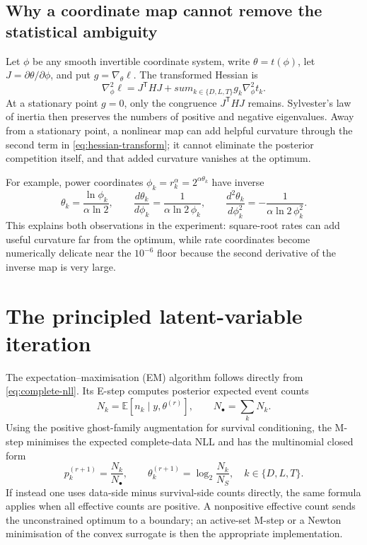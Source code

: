 \documentclass[11pt]{article}
\newcommand{\E}{\mathbb{E}}
\begin{document}
\subsection{Why a coordinate map cannot remove the statistical ambiguity}

Let $\phi$ be any smooth invertible coordinate system, write $\theta=t(\phi)$, let
$J=\partial\theta/\partial\phi$, and put $g=\nabla_\theta\ell$.  The transformed Hessian is
\begin{equation}
  \nabla_\phi^2\ell
  =J^\mathsf T HJ+sum_{k\in\{D,L,T\}}g_k\nabla_\phi^2t_k.
  \label{eq:hessian-transform}
\end{equation}
At a stationary point $g=0$, only the congruence $J^\mathsf THJ$ remains.  Sylvester's law of
inertia then preserves the numbers of positive and negative eigenvalues.  Away from a stationary
point, a nonlinear map can add helpful curvature through the second term in
\eqref{eq:hessian-transform}; it cannot eliminate the posterior competition itself, and that added
curvature vanishes at the optimum.

For example, power coordinates $\phi_k=r_k^\alpha=2^{\alpha\theta_k}$ have inverse
\[
  \theta_k=\frac{\ln\phi_k}{\alpha\ln2},\qquad
  \frac{d\theta_k}{d\phi_k}=\frac1{\alpha\ln2\,\phi_k},\qquad
  \frac{d^2\theta_k}{d\phi_k^2}=-\frac1{\alpha\ln2\,\phi_k^2}.
\]
This explains both observations in the experiment: square-root rates can add useful curvature far
from the optimum, while rate coordinates become numerically delicate near the $10^{-6}$ floor
because the second derivative of the inverse map is very large.

\section{The principled latent-variable iteration}

The expectation--maximisation (EM) algorithm follows directly from
\eqref{eq:complete-nll}.  Its E-step computes posterior expected event counts
\[
  N_k=\E[n_k\mid y,\theta^{(r)}],
  \qquad N_\bullet=\sum_kN_k.
\]
Using the positive ghost-family augmentation for survival conditioning, the M-step minimises the
expected complete-data NLL and has the multinomial closed form
\begin{equation}
  p_k^{(r+1)}=\frac{N_k}{N_\bullet},
  \qquad
  \theta_k^{(r+1)}=\log_2\frac{N_k}{N_S},
  \quad k\in\{D,L,T\}.                               \label{eq:em-update}
\end{equation}
If instead one uses data-side minus survival-side counts directly, the same formula applies when
all effective counts are positive.  A nonpositive effective count sends the unconstrained optimum
to a boundary; an active-set M-step or a Newton minimisation of the convex surrogate is then the
appropriate implementation.
\end{document}
